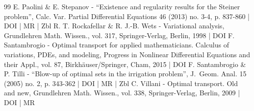 \documentclass[10pt]{amsart}
\theoremstyle{definition}
\begin{document}
\begin{thebibliography}{99}
E. Paolini \& E. Stepanov - “Existence and regularity results for the Steiner problem”, Calc. Var. Partial Differential Equations 46 (2013) no. 3-4, p. 837-860 | DOI | MR | Zbl
R. T. Rockafellar \& R. J.-B. Wets - Variational analysis, Grundlehren Math. Wissen., vol. 317, Springer-Verlag, Berlin, 1998 | DOI
F. Santambrogio - Optimal transport for applied mathematicians. Calculus of variations, PDEs, and modeling, Progress in Nonlinear Differential Equations and their Appl., vol. 87, Birkhäuser/Springer, Cham, 2015 | DOI
F. Santambrogio \& P. Tilli - “Blow-up of optimal sets in the irrigation problem”, J. Geom. Anal. 15 (2005) no. 2, p. 343-362 | DOI | MR | Zbl
C. Villani - Optimal transport. Old and new, Grundlehren Math. Wissen., vol. 338, Springer-Verlag, Berlin, 2009 | DOI | MR
\end{thebibliography}
\end{document}
